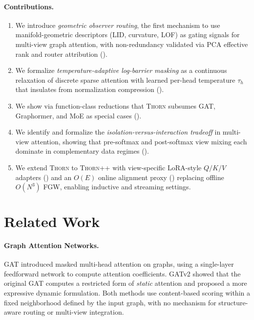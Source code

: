 \documentclass[11pt,a4paper]{article}
\newcommand{\thorn}{\textsc{Thorn}}
\newcommand{\thornpp}{\textsc{Thorn++}}
\begin{document}
\paragraph{Contributions.}
\begin{enumerate}[label=(\arabic*),nosep]
  \item We introduce \emph{geometric observer routing}, the first
    mechanism to use manifold-geometric descriptors (LID, curvature, LOF)
    as gating signals for multi-view graph attention, with
    non-redundancy validated via PCA effective rank and router attribution
    ().
  \item We formalize \emph{temperature-adaptive log-barrier masking}
    as a continuous relaxation of discrete sparse attention with learned
    per-head temperature $\tau_h$ that insulates from normalization
    compression ().
  \item We show via function-class reductions that \thorn{} subsumes
    GAT, Graphormer, and MoE as special cases
    ().
  \item We identify and formalize the \emph{isolation-versus-interaction
    tradeoff} in multi-view attention, showing that pre-softmax and
    post-softmax view mixing each dominate in complementary data regimes
    ().
  \item We extend \thorn{} to \thornpp{} with view-specific LoRA-style
    $Q/K/V$ adapters () and an $O(E)$ online
    alignment proxy () replacing offline $O(N^3)$
    FGW, enabling inductive and streaming settings.
\end{enumerate}

\section{Related Work}
\label{sec:related}

\paragraph{Graph Attention Networks.}
GAT \citep{velickovic2018graph} introduced masked multi-head attention on
graphs, using a single-layer feedforward network to compute attention
coefficients.
GATv2 \citep{brody2022how} showed that the original GAT computes a
restricted form of \emph{static} attention and proposed a more expressive
dynamic formulation.
Both methods use content-based scoring within a fixed neighborhood
defined by the input graph, with no mechanism for structure-aware
routing or multi-view integration.
\end{document}
